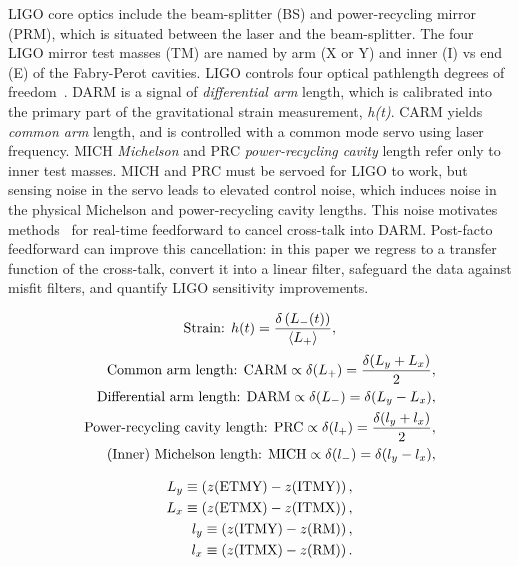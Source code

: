 LIGO core optics include the beam-splitter (BS) and power-recycling mirror (PRM), which is situated between the laser and the beam-splitter. The four LIGO mirror test masses (TM) are named by arm (X or Y) and inner (I) vs end (E) of the Fabry-Perot cavities. LIGO controls four optical pathlength degrees of freedom~\cite{LIGOFirst2004,ReadoutGWA}. DARM is a signal of \textit{differential arm} length, which is calibrated into the primary part of the gravitational strain measurement, \textit{h(t)}. CARM yields \textit{common arm} length, and is controlled with a common mode servo using laser frequency. MICH \textit{Michelson} and PRC \textit{power-recycling cavity} length refer only to inner test masses. MICH and PRC must be servoed for LIGO to work, but sensing noise in the servo leads to elevated control noise, which induces noise in the physical Michelson and power-recycling cavity lengths. This noise motivates methods~\cite{AllenHuaOttewill1999,AdhikariThesis} for real-time feedforward to cancel cross-talk into DARM. Post-facto feedforward can improve this cancellation: in this paper we regress to a transfer function of the cross-talk, convert it into a linear filter, safeguard the data against misfit filters, and quantify LIGO sensitivity improvements.

        \begin{eqnarray}
        \textup{Strain: } h(t) = \frac{\delta \left(L_{-}(t) \right)}{\langle L_{+}\rangle}, \label{hoftDef}
        \end{eqnarray}
        \begin{eqnarray}
        \textup{Common arm length: } \textup{CARM} \propto \delta(L_{+}) = \frac{\delta(L_y + L_x)}{2}, \label{CARMdef} \\
        \textup{Differential arm length: } \textup{DARM} \propto \delta(L_{-}) = \delta(L_y - L_x), \label{DARMdef} \\
        \textup{Power-recycling cavity length: }\textup{PRC} \propto \delta(l_{+}) = \frac{\delta(l_y + l_x)}{2}, \label{PRCdef} \\
        \textup{(Inner) Michelson length: } \textup{MICH} \propto \delta(l_{-}) = \delta(l_y - l_x), \label{MICHdef}
        \end{eqnarray}

        \begin{eqnarray}
        L_y \equiv \left(z(\textup{ETMY}) - z(\textup{ITMY})\right), \label{Lydef} \\
        L_x \equiv \left(z(\textup{ETMX}) - z(\textup{ITMX})\right), \label{Lxdef} \\
        l_y \equiv \left(z(\textup{ITMY}) - z(\textup{RM})\right), \label{lydef} \\
        l_x \equiv \left(z(\textup{ITMX}) - z(\textup{RM})\right). \label{lxdef}
        \end{eqnarray}


